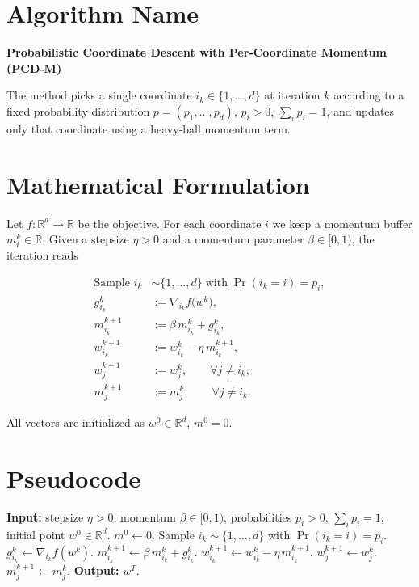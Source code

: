 \documentclass{article}
\newcommand{\R}{\mathbb{R}}
\begin{document}
\section*{Algorithm Name}
\textbf{Probabilistic Coordinate Descent with Per‑Coordinate Momentum (PCD‑M)}  

The method picks a single coordinate $i_k\in\{1,\dots,d\}$ at iteration $k$ according to a fixed probability distribution $p=(p_1,\dots,p_d)$, $p_i>0$, $\sum_i p_i=1$, and updates only that coordinate using a heavy‑ball momentum term.

\section*{Mathematical Formulation}
Let $f:\R^{d}\to\R$ be the objective.  
For each coordinate $i$ we keep a momentum buffer $m_i^{k}\in\R$.
Given a stepsize $\eta>0$ and a momentum parameter $\beta\in[0,1)$, the iteration reads

\[
\begin{aligned}
\text{Sample } i_k &\sim \{1,\dots,d\}\;\text{with}\; \Pr(i_k=i)=p_i,\\[4pt]
g_{i_k}^{k} &:= \nabla_{i_k} f\!\bigl(w^{k}\bigr),\\[4pt]
m_{i_k}^{k+1} &:= \beta\, m_{i_k}^{k}+ g_{i_k}^{k},\\[4pt]
w_{i_k}^{k+1} &:= w_{i_k}^{k}-\eta\, m_{i_k}^{k+1},\\[4pt]
w_{j}^{k+1} &:= w_{j}^{k},\qquad \forall j\neq i_k,\\[4pt]
m_{j}^{k+1} &:= m_{j}^{k},\qquad \forall j\neq i_k .
\end{aligned}
\tag{PCD‑M}
\]

All vectors are initialized as $w^{0}\in\R^{d}$, $m^{0}=0$.

\section*{Pseudocode}
\begin{algorithm}[H]
\caption{PCD‑M}
\begin{algorithmic}[1]
\STATE \textbf{Input:} stepsize $\eta>0$, momentum $\beta\in[0,1)$, probabilities $p_i>0$, $\sum_i p_i=1$, initial point $w^{0}\in\R^{d}$.
\STATE $m^{0}\gets 0$.
    \STATE Sample $i_k\sim\{1,\dots,d\}$ with $\Pr(i_k=i)=p_i$.
    \STATE $g_{i_k}^{k}\gets \nabla_{i_k}f(w^{k})$.
    \STATE $m_{i_k}^{k+1}\gets \beta\,m_{i_k}^{k}+g_{i_k}^{k}$.
    \STATE $w_{i_k}^{k+1}\gets w_{i_k}^{k}-\eta\,m_{i_k}^{k+1}$.
        \STATE $w_{j}^{k+1}\gets w_{j}^{k}$.
        \STATE $m_{j}^{k+1}\gets m_{j}^{k}$.
    \ENDFOR
\ENDFOR
\STATE \textbf{Output:} $w^{T}$.
\end{algorithmic}
\end{algorithm}
\end{document}
